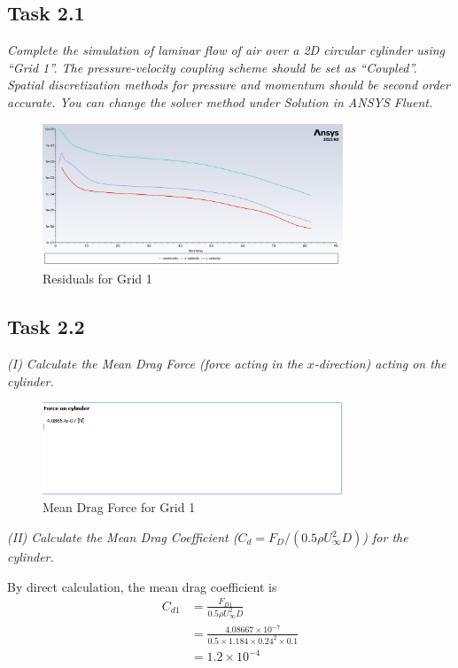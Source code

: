 \subsection*{Task 2.1}
\textit{Complete the simulation of laminar flow of air over a 2D circular cylinder using “Grid 1”. The pressure-velocity coupling scheme should be set as “Coupled”. Spatial discretization methods for pressure and momentum should be second order accurate. You can change the solver method under Solution in ANSYS Fluent.}
\begin{figure}[H]
    \centering
    \includegraphics[width=0.8\textwidth]{Questions/Figures/residuals grid 1.png}
    \caption{Residuals for Grid 1}
\end{figure}

\subsection*{Task 2.2}
\textit{(I) Calculate the Mean Drag Force (force acting in the $x$-direction) acting on the cylinder.}
\begin{figure}[H]
    \centering
    \includegraphics[width=0.8\textwidth]{Questions/Figures/force on cylinder grid 1.png}
    \caption{Mean Drag Force for Grid 1}
\end{figure}

\textit{(II) Calculate the Mean Drag Coefficient ($C_d = F_D/(0.5\rho U_\infty^2 D)$) for the cylinder.}

By direct calculation, the mean drag coefficient is
\begin{align*}
    C_{d1} &= \frac{F_{D1}}{0.5\rho U_\infty^2 D} \\
    &= \frac{4.08667 \times 10^{-7}}{0.5 \times 1.184 \times 0.24^2 \times 0.1} \\
    &= 1.2 \times 10^{-4}
\end{align*}

